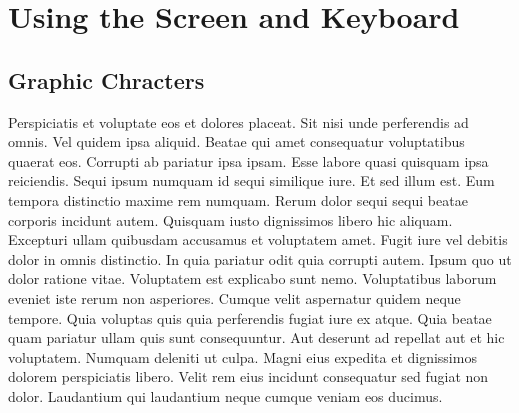 
\makeatletter\@openrightfalse
\part{Using the Screen and Keyboard}



\chapter*{Graphic Chracters}

Perspiciatis et voluptate eos et dolores placeat. Sit nisi unde perferendis ad
omnis. Vel quidem ipsa aliquid. Beatae qui amet consequatur voluptatibus
quaerat eos. Corrupti ab pariatur ipsa ipsam. Esse labore quasi quisquam ipsa
reiciendis. Sequi ipsum numquam id sequi similique iure. Et sed illum est. Eum
tempora distinctio maxime rem numquam. Rerum dolor sequi sequi beatae corporis
incidunt autem. Quisquam iusto dignissimos libero hic aliquam. Excepturi ullam
quibusdam accusamus et voluptatem amet. Fugit iure vel debitis dolor in omnis
distinctio. In quia pariatur odit quia corrupti autem. Ipsum quo ut dolor
ratione vitae. Voluptatem est explicabo sunt nemo. Voluptatibus laborum eveniet
iste rerum non asperiores. Cumque velit aspernatur quidem neque tempore. Quia
voluptas quis quia perferendis fugiat iure ex atque. Quia beatae quam pariatur
ullam quis sunt consequuntur. Aut deserunt ad repellat aut et hic voluptatem.
Numquam deleniti ut culpa. Magni eius expedita et dignissimos dolorem
perspiciatis libero. Velit rem eius incidunt consequatur sed fugiat non dolor.
Laudantium qui laudantium neque cumque veniam eos ducimus.

